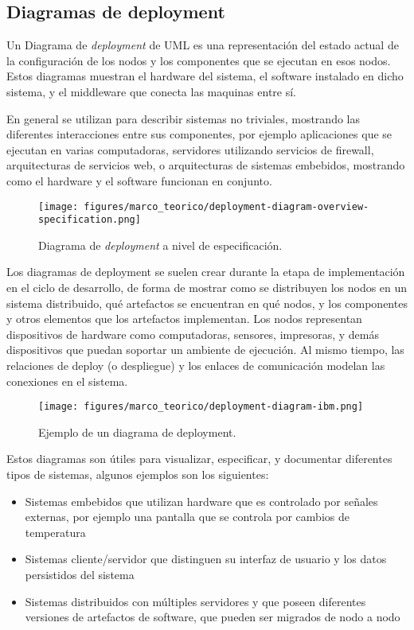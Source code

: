 \subsection{Diagramas de deployment}
Un Diagrama de \textit{deployment} de UML es una representación del estado actual de la configuración de los nodos y los componentes que se ejecutan en esos nodos. Estos diagramas muestran el hardware del sistema, el software instalado en dicho sistema, y el middleware que conecta las maquinas entre sí. \cite{ambler2018deployment}

En general se utilizan para describir sistemas no triviales, mostrando las diferentes interacciones entre sus componentes, por ejemplo aplicaciones que se ejecutan en varias computadoras, servidores utilizando servicios de firewall, arquitecturas de servicios web, o arquitecturas de sistemas embebidos, mostrando como el hardware y el software funcionan en conjunto.

\begin{figure}[htbp]
    \centering
    \texttt{[image: figures/marco\_teorico/deployment-diagram-overview-specification.png]}
    \caption{Diagrama de \textit{deployment} a nivel de especificación. \cite{deploymentdiagramoverview}}
    \label{fig:marco:diagram_overview}
\end{figure}

Los diagramas de deployment se suelen crear durante la etapa de implementación en el ciclo de desarrollo, de forma de mostrar como se distribuyen los nodos en un sistema distribuido, qué artefactos se encuentran en qué nodos, y los componentes y otros elementos que los artefactos implementan. Los nodos representan dispositivos de hardware como computadoras, sensores, impresoras, y demás dispositivos que puedan soportar un ambiente de ejecución. Al mismo tiempo, las relaciones de deploy (o despliegue) y los enlaces de comunicación modelan las conexiones en el sistema. \cite{ibmdeploymentdiagrams}

\begin{figure}[htbp]
    \centering
    \texttt{[image: figures/marco\_teorico/deployment-diagram-ibm.png]}
    \caption{Ejemplo de un diagrama de deployment. \cite{ibmdeploymentdiagrams}}
    \label{fig:marco:ibmdeploymentdiagram}
\end{figure}

Estos diagramas son útiles para visualizar, especificar, y documentar diferentes tipos de sistemas, algunos ejemplos son los siguientes: \cite{ibmdeploymentdiagrams}
\begin{itemize}
    \item Sistemas embebidos que utilizan hardware que es controlado por señales externas, por ejemplo una pantalla que se controla por cambios de temperatura
    \item Sistemas cliente/servidor que distinguen su interfaz de usuario y los datos persistidos del sistema
    \item Sistemas distribuidos con múltiples servidores y que poseen diferentes versiones de artefactos de software, que pueden ser migrados de nodo a nodo
\end{itemize}

